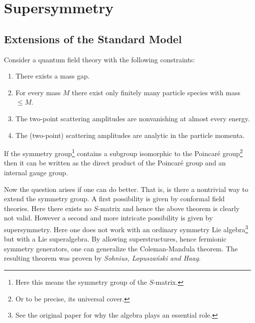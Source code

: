 \chapter{Supersymmetry}

\section{Extensions of the Standard Model}

	\begin{theorem}
		Consider a quantum field theory with the following constraints:
		\begin{enumerate}
			\item There exists a mass gap.
			\item For every mass $M$ there exist only finitely many particle species with mass $\leq M$.
			\item The two-point scattering amplitudes are nonvanishing at almost every energy.
			\item The (two-point) scattering amplitudes are analytic in the particle momenta.
		\end{enumerate}
		If the symmetry group\footnote{Here this means the symmetry group of the $S$-matrix.} contains a subgroup isomorphic to the Poincar\'e group\footnote{Or to be precise, its universal cover.} then it can be written as the direct product of the Poincar\'e group and an internal gauge group.
	\end{theorem}
	
	Now the question arises if one can do better. That is, is there a nontrivial way to extend the symmetry group. A first possibility is given by conformal field theories. Here there exists no $S$-matrix and hence the above theorem is clearly not valid. However a second and more intricate possibility is given by supersymmetry. Here one does not work with an ordinary symmetry Lie algebra\footnote{See the original paper \cite{coleman_mandula} for why the algebra plays an essential role.} but with a Lie superalgebra. By allowing superstructures, hence fermionic symmetry generators, one can generalize the Coleman-Mandula theorem. The resulting theorem was proven by \textit{Sohnius, Lopusza\'nski and Haag}.
